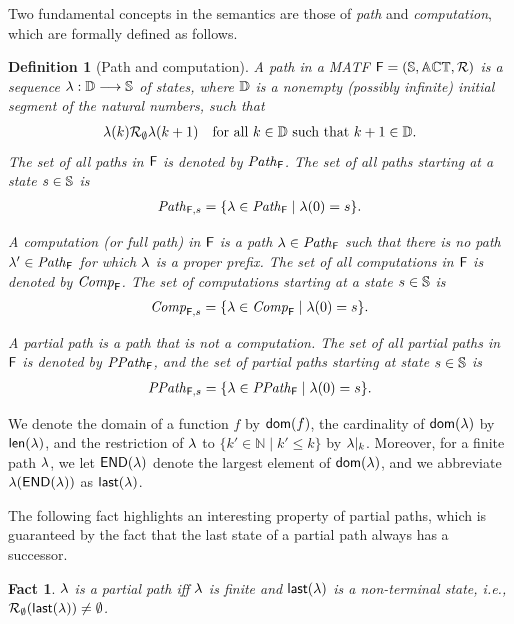 \documentclass{article}
\newtheorem{fact}{Fact}
\newtheorem{definition}{Definition}
\begin{document}
Two fundamental concepts in the semantics are those of \emph{path} and \emph{computation}, which are formally defined as follows.

\begin{definition}[Path and computation]
A \emph{path}  in a MATF $\mathsf{F} = (\mathbb{S} ,  \mathbb{ACT},  \mathcal{R})$ 
is a sequence $\lambda: \mathbb{D} \longrightarrow \mathbb{S}$ of states, where $\mathbb{D}$ is a nonempty (possibly  infinite) initial segment of the natural numbers, such that 
\begin{align*}
\lambda(k) \mathcal{R}_{\emptyset} \lambda(k+1) \quad \text{for all } k \in \mathbb{D} \text{ such that } k+1 \in \mathbb{D}.
\end{align*}
The set of all paths in $\mathsf{F}$ is denoted by $\mathit{Path}_{\mathsf{F}}$. The set of all paths starting at a state $s \in \mathbb{S}$ is 
\begin{align*}
\mathit{Path}_{\mathsf{F},s} = \{ \lambda \in \mathit{Path}_{\mathsf{F}} \mid \lambda(0) = s \}.
\end{align*}

A \emph{computation} (or \emph{full path}) in $\mathsf{F}$ is a path $\lambda \in \mathit{Path}_{\mathsf{F}}$ such that there is no path $\lambda' \in \mathit{Path}_{\mathsf{F}}$ for which $\lambda$ is a proper prefix. The set of all computations in $\mathsf{F}$ is denoted by $\mathit{Comp}_{\mathsf{F}}$. The set of computations starting at a state $s \in \mathbb{S}$ is 
\begin{align*}
\mathit{Comp}_{\mathsf{F},s} = \{ \lambda \in \mathit{Comp}_{\mathsf{F}} \mid \lambda(0) = s \}.
\end{align*}


A \emph{partial path} is a path that is not a computation. The set of all partial paths in $\mathsf{F}$ is denoted by $\mathit{PPath}_{\mathsf{F}}$, and the set of partial paths starting at state $s \in \mathbb{S}$ is 
\begin{align*}
\mathit{PPath}_{\mathsf{F},s} = \{ \lambda \in \mathit{PPath}_{\mathsf{F}} \mid \lambda(0) = s \}.
\end{align*}
\end{definition}


We denote the domain of a function $f$ by $\mathsf{dom}(f)$, the cardinality of $\mathsf{dom}(\lambda)$ by $\mathsf{len}(\lambda)$, and the restriction of $\lambda$ to $\{ k' \in \mathbb{N} \mid k' \le k \}$ by $\lambda|_k$. 
Moreover, for a finite path $\lambda$, we let $\mathsf{END}(\lambda)$ denote the largest element of $\mathsf{dom}(\lambda)$, and we abbreviate $\lambda(\mathsf{END}(\lambda))$ as $\mathsf{last}(\lambda)$.


The following fact  highlights an interesting property of partial paths, which is guaranteed by the fact that the last state of a partial path always has a successor.
\begin{fact}\label{fact:one}
$\lambda $ is a partial path iff 
$\lambda $ is finite and $\mathsf{last}(\lambda)$ is a non-terminal state, i.e., 
$\mathcal{R}_{\emptyset}(\mathsf{last}(\lambda))\neq \emptyset $. 
\end{fact}
\end{document}
